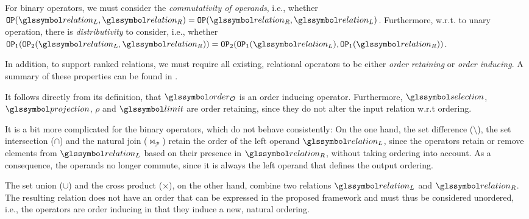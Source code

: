 For binary operators, we must consider the \emph{commutativity of operands}, i.e., whether $\mathtt{OP} (\relation_L, \relation_R) = \mathtt{OP}(\relation_R, \relation_L)$. Furthermore, w.r.t. to unary operation, there is \emph{distributivity} to consider, i.e., whether $\mathtt{OP}_{1} (\mathtt{OP}_{2} (\relation_L,  \relation_R)) = \mathtt{OP}_{2} ( \mathtt{OP}_{1} ( \relation_L), \mathtt{OP}_{1} ( \relation_R))$. 

In addition, to support ranked relations, we must require all existing, relational operators to be either \emph{order retaining} or \emph{order inducing}. A summary of these properties can be found in . 

It follows directly from its definition, that $\order_{\mathcal{O}}$ is an order inducing operator. Furthermore, $\selection$, $\projection$, $\rho$ and $\limit$ are order retaining, since they do not alter the input relation w.r.t ordering.

It is a bit more complicated for the binary operators, which do not behave consistently: On the one hand, the set difference ($\setminus$), the set intersection ($\cap$) and the natural join ($\Join_{\mathcal{P}}$) retain the order of the left operand $\relation_L$, since the operators retain or remove elements from $\relation_L$ based on their presence in $\relation_R$, without taking ordering into account. As a consequence, the operands no longer commute, since it is always the left operand that defines the output ordering.

The set union ($\cup$) and the cross product ($\times$), on the other hand, combine two relations $\relation_L$ and $\relation_R$. The resulting relation does not have an order that can be expressed in the proposed framework and must thus be considered unordered, i.e., the operators are order inducing in that they induce a new, natural ordering.

